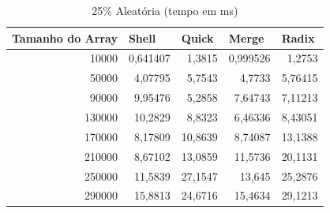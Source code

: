 \documentclass[a4paper, 12pt]{article}
\begin{document}
\begin{longtable}[c]{@{}rrrrr@{}}
	\caption{25\% Aleatória (tempo em ms)}
	\label{tab:aleatoria252-table}\\
	\toprule
	\multicolumn{1}{l}{\textbf{Tamanho do Array}} & \multicolumn{1}{l}{\textbf{Shell}} & \multicolumn{1}{l}{\textbf{Quick}} & \multicolumn{1}{l}{\textbf{Merge}} & \multicolumn{1}{l}{\textbf{Radix}} \\* \midrule
	\endfirsthead
	\endhead
	\multicolumn{1}{|r|}{10000}                   & \multicolumn{1}{r|}{0,641407}      & \multicolumn{1}{r|}{1,3815}        & \multicolumn{1}{r|}{0,999526}      & \multicolumn{1}{r|}{1,2753}        \\* \midrule
	\multicolumn{1}{|r|}{50000}                   & \multicolumn{1}{r|}{4,07795}       & \multicolumn{1}{r|}{5,7543}        & \multicolumn{1}{r|}{4,7733}        & \multicolumn{1}{r|}{5,76415}       \\* \midrule
	\multicolumn{1}{|r|}{90000}                   & \multicolumn{1}{r|}{9,95476}       & \multicolumn{1}{r|}{5,2858}        & \multicolumn{1}{r|}{7,64743}       & \multicolumn{1}{r|}{7,11213}       \\* \midrule
	\multicolumn{1}{|r|}{130000}                  & \multicolumn{1}{r|}{10,2829}       & \multicolumn{1}{r|}{8,8323}        & \multicolumn{1}{r|}{6,46336}       & \multicolumn{1}{r|}{8,43051}       \\* \midrule
	\multicolumn{1}{|r|}{170000}                  & \multicolumn{1}{r|}{8,17809}       & \multicolumn{1}{r|}{10,8639}       & \multicolumn{1}{r|}{8,74087}       & \multicolumn{1}{r|}{13,1388}       \\* \midrule
	\multicolumn{1}{|r|}{210000}                  & \multicolumn{1}{r|}{8,67102}       & \multicolumn{1}{r|}{13,0859}       & \multicolumn{1}{r|}{11,5736}       & \multicolumn{1}{r|}{20,1131}       \\* \midrule
	\multicolumn{1}{|r|}{250000}                  & \multicolumn{1}{r|}{11,5839}       & \multicolumn{1}{r|}{27,1547}       & \multicolumn{1}{r|}{13,645}        & \multicolumn{1}{r|}{25,2876}       \\* \midrule
	\multicolumn{1}{|r|}{290000}                  & \multicolumn{1}{r|}{15,8813}       & \multicolumn{1}{r|}{24,6716}       & \multicolumn{1}{r|}{15,4634}       & \multicolumn{1}{r|}{29,1213}       \\* \midrule

\end{longtable}
\end{document}
